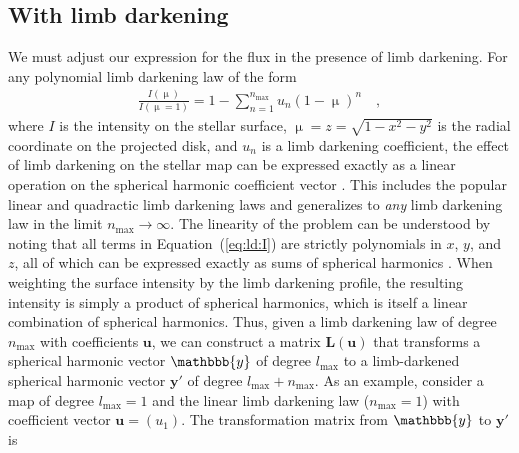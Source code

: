 \documentclass[modern]{aastex62}
\begin{document}
\subsection{With limb darkening}
%
\label{sec:ld}
We must adjust our expression for the flux in the presence of limb darkening.
For any polynomial limb darkening law of the form
%
\begin{align}
    \label{eq:ld:I}
    \frac{I(\upmu)}{I(\upmu = 1)} = 1 - \sum_{n=1}^{n_\mathrm{max}} u_n(1 - \upmu)^n
    \quad,
\end{align}
%
where $I$ is the intensity on the stellar surface,
$\upmu = z = \sqrt{1 - x^2 - y^2}$ is the radial coordinate on the
projected disk, and $u_n$ is a limb darkening coefficient, the effect of
limb darkening on the stellar map can be expressed exactly as a linear
operation on the spherical harmonic coefficient vector
\citep{Luger2019}.
This includes the popular linear and quadractic limb darkening laws
and generalizes to \emph{any} limb darkening law in the limit
$n_\mathrm{max} \rightarrow \infty$. The linearity of the problem
can be understood by noting that all terms
in Equation~(\ref{eq:ld:I}) are strictly polynomials in $x$, $y$, and $z$,
all of which can be expressed exactly as sums of spherical harmonics
\citep{Luger2019}. When weighting the surface intensity by the limb darkening
profile, the resulting intensity is simply a product of spherical harmonics,
which is itself a linear combination of spherical harmonics.
Thus, given a limb darkening law
of degree $n_\mathrm{max}$ with coefficients $\mathbf{u}$,
we can construct a matrix $\mathbf{L}(\mathbf{u})$
that transforms a spherical harmonic vector $\mathbbb{y}$ of degree
$l_\mathrm{max}$ to a limb-darkened spherical harmonic vector $\mathbf{y'}$
of degree $l_\mathrm{max} + n_\mathrm{max}$. As an example, consider
a map of degree $l_\mathrm{max} = 1$ and the linear limb darkening law
($n_\mathrm{max} = 1$) with coefficient vector $\mathbf{u} = ( u_1 )$.
The transformation matrix from $\mathbbb{y}$ to $\mathbf{y'}$ is
%
\end{document}
